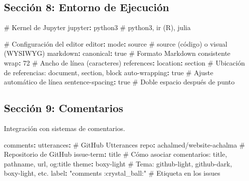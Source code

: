 \documentclass[
  doc,
  floatsintext,
  longtable,
  a4paper,
  nolmodern,
  notxfonts,
  notimes,
  12pt,
  colorlinks=true,linkcolor=blue,citecolor=blue,urlcolor=blue]{apa7}
\newenvironment{Shaded}{\begin{snugshade}}{\end{snugshade}}
\newcommand{\AttributeTok}[1]{\textcolor[rgb]{0.40,0.45,0.13}{#1}}
\newcommand{\CharTok}[1]{\textcolor[rgb]{0.13,0.47,0.30}{#1}}
\newcommand{\CommentTok}[1]{\textcolor[rgb]{0.37,0.37,0.37}{#1}}
\newcommand{\DecValTok}[1]{\textcolor[rgb]{0.68,0.00,0.00}{#1}}
\newcommand{\FunctionTok}[1]{\textcolor[rgb]{0.28,0.35,0.67}{#1}}
\newcommand{\KeywordTok}[1]{\textcolor[rgb]{0.00,0.23,0.31}{\textbf{#1}}}
\newcommand{\StringTok}[1]{\textcolor[rgb]{0.13,0.47,0.30}{#1}}
\begin{document}
\subsection{Sección 8: Entorno de
Ejecución}\label{secciuxf3n-8-entorno-de-ejecuciuxf3n}

\begin{Shaded}
\begin{Highlighting}[]
\CommentTok{\# Kernel de Jupyter}
\FunctionTok{jupyter}\KeywordTok{:}\AttributeTok{ python3}\CommentTok{                  \# python3, ir (R), julia}

\CommentTok{\# Configuración del editor}
\FunctionTok{editor}\KeywordTok{:}
\AttributeTok{  }\FunctionTok{mode}\KeywordTok{:}\AttributeTok{ source}\CommentTok{                    \# source (código) o visual (WYSIWYG)}
\AttributeTok{  }
\AttributeTok{  }\FunctionTok{markdown}\KeywordTok{:}
\AttributeTok{    }\FunctionTok{canonical}\KeywordTok{:}\AttributeTok{ }\CharTok{true}\CommentTok{               \# Formato Markdown consistente}
\AttributeTok{    }\FunctionTok{wrap}\KeywordTok{:}\AttributeTok{ }\DecValTok{72}\CommentTok{                      \# Ancho de línea (caracteres)}
\AttributeTok{    }\FunctionTok{references}\KeywordTok{:}
\AttributeTok{      }\FunctionTok{location}\KeywordTok{:}\AttributeTok{ section}\CommentTok{           \# Ubicación de referencias: document, section, block}
\AttributeTok{    }\FunctionTok{auto{-}wrapping}\KeywordTok{:}\AttributeTok{ }\CharTok{true}\CommentTok{           \# Ajuste automático de línea}
\AttributeTok{    }\FunctionTok{sentence{-}spacing}\KeywordTok{:}\AttributeTok{ }\CharTok{true}\CommentTok{        \# Doble espacio después de punto}
\end{Highlighting}
\end{Shaded}

\subsection{Sección 9: Comentarios}\label{secciuxf3n-9-comentarios}

Integración con sistemas de comentarios.

\begin{Shaded}
\begin{Highlighting}[]
\FunctionTok{comments}\KeywordTok{:}
\AttributeTok{  }\FunctionTok{utterances}\KeywordTok{:}\CommentTok{                         \# GitHub Utterances}
\AttributeTok{    }\FunctionTok{repo}\KeywordTok{:}\AttributeTok{ achalmed/website{-}achalma}\CommentTok{    \# Repositorio de GitHub}
\AttributeTok{    }\FunctionTok{issue{-}term}\KeywordTok{:}\AttributeTok{ title}\CommentTok{                 \# Cómo asociar comentarios: title, pathname, url, og:title}
\AttributeTok{    }\FunctionTok{theme}\KeywordTok{:}\AttributeTok{ boxy{-}light}\CommentTok{                 \# Tema: github{-}light, github{-}dark, boxy{-}light, etc.}
\AttributeTok{    }\FunctionTok{label}\KeywordTok{:}\AttributeTok{ }\StringTok{"comments :crystal\_ball:"}\CommentTok{  \# Etiqueta en los issues}
\end{Highlighting}
\end{Shaded}
\end{document}
